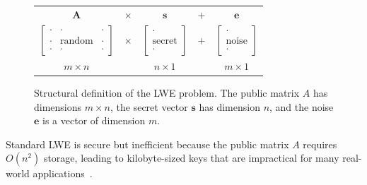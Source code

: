 \begin{figure}[htbp]
    \centering
    \begin{tabular}{ccccc}
        $\mathbf{A}$ & $\times$ & $\mathbf{s}$ & $+$ & $\mathbf{e}$ \\
        $\left[ \begin{array}{ccc}
                    \cdot & \cdot & \cdot \\
                    \cdot & \text{random} & \cdot \\
                    \cdot & \cdot & \cdot
        \end{array} \right]$ &
        $\times$ &
        $\left[ \begin{array}{c}
                    \cdot \\ \text{secret} \\ \cdot
        \end{array} \right]$ &
        $+$ &
        $\left[ \begin{array}{c}
                    \cdot \\ \text{noise} \\ \cdot
        \end{array} \right]$ \\
        $m \times n$ & & $n \times 1$ & & $m \times 1$
    \end{tabular}
    \caption{Structural definition of the LWE problem. The public matrix $A$ has dimensions $m \times n$, the secret vector $\mathbf{s}$ has dimension $n$, and the noise $\mathbf{e}$ is a vector of dimension $m$. }
    \label{fig:lwe_definition_matrix}
\end{figure}

Standard LWE is secure but inefficient because the public matrix $A$ requires $O(n^2)$ storage, leading to kilobyte-sized keys that are impractical for many real-world applications~\cite{Lindner2011-wg}.

